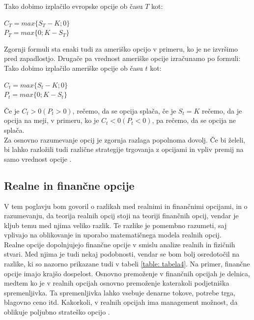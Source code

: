 Tako dobimo izplačilo evropske opcije ob času $T$ kot:
\begin{center}
$C_T = max\{S_T - K; 0\}$\\
$P_T = max\{0; K - S_T\}$
\end{center}  
Zgornji formuli sta enaki tudi za ameriško opcijo v primeru, ko je ne izvršimo pred zapadlostjo. Drugače pa vrednost ameriške opcije izračunamo po formuli:\\
Tako dobimo izplačilo ameriške opcije ob času $t$ kot:
\begin{center}
$C_t = max\{S_t - K; 0\}$\\
$P_t = max\{0; K - S_t\}$
\end{center}  
Če je $C_t>0 (P_t>0)$, rečemo, da se opcija splača, če je $S_t=K$ rečemo, da je opcija na meji, v primeru, ko je $C_t<0 (P_t<0)$, pa rečemo, da se opcija ne splača.\\
Za osnovno razumevanje opcij je zgornja razlaga popolnoma dovolj. Če bi želeli, bi lahko razložili tudi različne strategije trgovanja z opcijami in vpliv premij na samo vrednost opcije \cite[str. 54-58]{Kosir}.

\subsection{Realne in finančne opcije}
V tem poglavju bom govoril o razlikah med realnimi in finančnimi opcijami, in o razumevanju, da teorija realnih opcij stoji na teoriji finančnih opcij, vendar je kljub temu med njima veliko razlik. Te razlike je pomembno razumeti, saj vplivajo na oblikovanje in uporabo matematičnega modela realnih opcij. \\

Realne opcije dopolnjujejo finančne opcije v smislu analize realnih in fizičnih stvari. Med njima je tudi nekaj podobnosti, vendar se bom bolj osredotočil na razlike, ki so nazorno prikazane tudi v tabeli \ref{table: tabela4}. Na primer, finančne opcije imajo krajšo dospelost. Osnovno premoženje v finančnih opcijah je delnica, medtem ko je v realnih opcijah osnovno premoženje katerakoli podjetniška spremenljivka. Ta spremenljivka lahko vsebuje denarne tokove, potrebe trga, blagovno ceno itd. Kakorkoli, v realnih opcijah ima management možnost, da oblikuje poljubno strateško opcijo \cite[str. 109, 110]{Mun}.
\pagebreak

